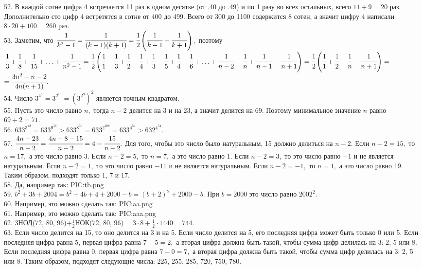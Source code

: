 52. В каждой сотне цифра 4 встречается 11 раз в одном десятке (от .40 до .49) и по 1 разу во всех остальных, всего $11+9=20$ раз. Дополнительно сто цифр 4 встретятся в сотне от 400 до 499. Всего от 300 до 1100 содержится 8 сотен, а значит цифру 4 написали $8\cdot20+100=260$ раз.\\
53. Заметим, что $\cfrac{1}{k^2-1}=\cfrac{1}{(k-1)(k+1)}=\cfrac{1}{2}\left(\cfrac{1}{k-1}-\cfrac{1}{k+1}\right),$ поэтому
$\cfrac{1}{3}+\cfrac{1}{8}+\cfrac{1}{15}+\ldots+\cfrac{1}{n^2-1}=\cfrac{1}{2}\left(\cfrac{1}{1}-\cfrac{1}{3}+\cfrac{1}{2}-\cfrac{1}{4}+
\cfrac{1}{3}-\cfrac{1}{5}+\cfrac{1}{4}-\cfrac{1}{6}+\ldots+\cfrac{1}{n-2}-\cfrac{1}{n}+\cfrac{1}{n-1}-\cfrac{1}{n+1}\right)=
\cfrac{1}{2}\left(\cfrac{1}{1}+\cfrac{1}{2}-\cfrac{1}{n}-\cfrac{1}{n+1}\right)=$\\$=\cfrac{3n^2-n-2}{4n(n+1)}.$\\
54. Число $3^{4^5}=3^{2^{10}}=\left(3^{2^9}\right)^2$ является точным квадратом.\\
55. Пусть это число равно $n,$ тогда $n-2$ делится на 3 и на 23, а значит делится на 69. Поэтому минимальное значение $n$ равно $69+2=71.$\\
56. $633^{3^{72}}=633^{9^{36}}>633^{8^{36}}=633^{2^{108}}=633^{4^{54}}>632^{4^{54}}.$\\
57. $\cfrac{4n-23}{n-2}=\cfrac{4n-8-15}{n-2}=4-\cfrac{15}{n-2}.$ Для того, чтобы это число было натуральным, 15 должно делиться на $n-2.$ Если $n-2=15,$ то $n=17,$ а это число равно 3. Если $n-2=5,$ то $n=7,$ а это число равно 1. Если $n-2=3,$ то это число равно $-1$ и не является натуральным. Если $n-2=1,$ то это число равно $-11$ и не является натуральным. Если $n-2=-1,$ то $n=1,$ а это число равно 19. Таким образом, подходят только 1, 7 и 17.\\
58. Да, например так:
{{PIC:tb.png}}\\
59. $b^2+3b+2004=b^2+4b+4+2000-b=(b+2)^2+2000-b.$ При $b=2000$ это число равно $2002^2.$\\
60. Например, это можно сделать так:
{{PIC:aa.png}}\\
61. Например, это можно сделать так:
{{PIC:aaa.png}}\\
62. 3НОД(72, 80, 96)+$\frac{1}{2}$НОК(72, 80, 96)$=3\cdot8+\frac{1}{2}\cdot1440=744.$\\
63. Если число делится на 15, то оно делится на 3 и на 5. Если число делится на 5, его последняя цифра может быть только 0 или 5. Если последняя цифра равна 5, первая цифра равна $7-5=2,$ а вторая цифра должна быть такой, чтобы сумма цифр делилась на 3: 2, 5 или 8. Если последняя цифра равна 0, первая цифра равна $7-0=7,$ а вторая цифра должна быть такой, чтобы сумма цифр делилась на 3: 2, 5 или 8. Таким образом, подходят следующие числа: 225, 255, 285, 720, 750, 780.\\
